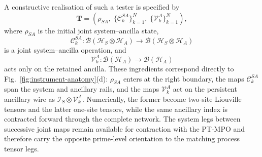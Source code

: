 A constructive realisation of such a tester is specified by
%
\begin{equation}
    \mathbf T
    = \left( \rho_{SA},\; \{\mathcal C_k^{SA}\}_{k=1}^{N},\; \{\mathcal V_k^{A}\}_{k=1}^{N} \right),
    \label{eq:tester-sequential-realisation}
\end{equation}
%
where \(\rho_{SA}\) is the initial joint system--ancilla state,
%
\begin{equation}
    \mathcal C_k^{SA}: \mathcal B(\mathcal H_S\otimes\mathcal H_A) \longrightarrow \mathcal B(\mathcal H_S\otimes\mathcal H_A)
    \label{eq:tester-joint-map}
\end{equation}
%
is a joint system--ancilla operation, and
%
\begin{equation}
    \mathcal V_k^{A}: \mathcal B(\mathcal H_A) \longrightarrow \mathcal B(\mathcal H_A)
    \label{eq:tester-ancilla-map}
\end{equation}
%
acts only on the retained ancilla.
These ingredients correspond directly to Fig.~\ref{fig:instrument-anatomy}(d): \(\rho_{SA}\) enters at the right boundary, the maps \(\mathcal C_k^{SA}\) span the system and ancillary rails, and the maps \(\mathcal V_k^A\) act on the persistent ancillary wire as \(\mathcal I_S\otimes\mathcal V_k^A\).
Numerically, the former become two-site Liouville tensors and the latter one-site tensors, while the same ancillary index is contracted forward through the complete network.
The system legs between successive joint maps remain available for contraction with the PT-MPO and therefore carry the opposite prime-level orientation to the matching process tensor legs.

